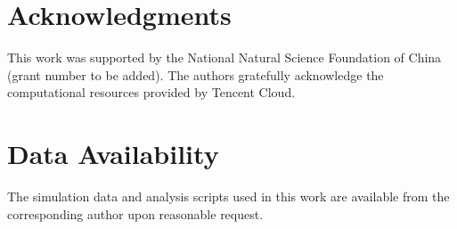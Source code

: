 \section*{Acknowledgments}

This work was supported by the National Natural Science Foundation of China (grant number to be added).
The authors gratefully acknowledge the computational resources provided by Tencent Cloud.

\section*{Data Availability}

The simulation data and analysis scripts used in this work are available from the corresponding author upon reasonable request.